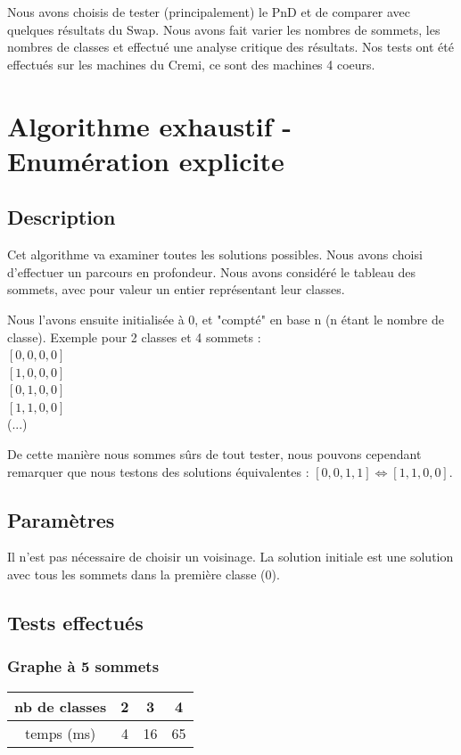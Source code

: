 \documentclass[12pt]{article}
\begin{document}
Nous avons choisis de tester (principalement) le PnD et de comparer avec quelques résultats du Swap. Nous avons fait varier les nombres de sommets, les nombres de classes et effectué une analyse critique des résultats. Nos tests ont été effectués sur les machines du Cremi, ce sont des machines 4 coeurs.

\newpage

\section{Algorithme exhaustif - Enumération explicite}
\subsection{Description}
Cet algorithme va examiner toutes les solutions possibles. Nous avons choisi d'effectuer un parcours en profondeur.
Nous avons considéré le tableau des sommets, avec pour valeur un entier représentant leur classes.
~\par Nous l'avons ensuite initialisée à 0, et "compté" en base n (n étant le nombre de classe). Exemple pour 2 classes et 4 sommets :
~\\ $[0, 0, 0, 0]$
~\\ $[1, 0, 0, 0]$
~\\ $[0, 1, 0, 0]$
~\\ $[1, 1, 0, 0]$
~\\ (...)
~\par De cette manière nous sommes sûrs de tout tester, nous pouvons cependant remarquer que nous testons des solutions équivalentes : $[0, 0, 1, 1] \Leftrightarrow [1, 1, 0, 0]$.

\subsection{Paramètres}
Il n’est pas nécessaire de choisir un voisinage. La solution initiale est une solution avec tous les sommets dans la première classe (0).

\subsection{Tests effectués}

\subsubsection{Graphe à 5 sommets}

\begin{tabular}{|c|c|c|c|}
	\hline 
	nb de classes & 2 & 3 & 4 \\
	\hline
	temps (ms) & 4 & 16 & 65 \\
	\hline
\end{tabular}
\end{document}
